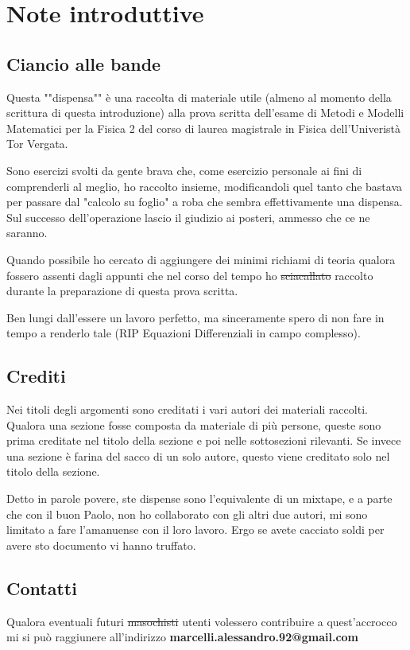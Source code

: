 \chapter{Note introduttive}

\section{Ciancio alle bande}

Questa ""dispensa"" è una raccolta di materiale utile (almeno al momento della scrittura di questa introduzione) alla prova scritta dell'esame  di Metodi e Modelli Matematici per la Fisica 2 del corso di laurea magistrale in Fisica dell'Univeristà Tor Vergata. 

Sono esercizi svolti da gente brava che, come esercizio personale ai fini di comprenderli al meglio, ho raccolto insieme, modificandoli quel tanto che bastava per passare dal "calcolo su foglio" a roba che sembra effettivamente una dispensa. Sul successo dell'operazione lascio il giudizio ai posteri, ammesso che ce ne saranno.

Quando possibile ho cercato di aggiungere dei minimi richiami di teoria qualora fossero assenti dagli appunti che nel corso del tempo ho \st{sciacallato} raccolto durante la preparazione di questa prova scritta.

Ben lungi dall'essere un lavoro perfetto, ma sinceramente spero di non fare in tempo a renderlo tale (RIP Equazioni Differenziali in campo complesso). 

\section{Crediti}

Nei titoli degli argomenti sono creditati i vari autori dei materiali raccolti. Qualora una sezione fosse composta da materiale di più persone, queste sono prima creditate nel titolo della sezione e poi nelle sottosezioni rilevanti. Se invece una sezione è farina del sacco di un solo autore, questo viene creditato solo nel titolo della sezione.

Detto in parole povere, ste dispense sono l'equivalente di un mixtape, e a parte che con il buon Paolo, non ho collaborato con gli altri due autori, mi sono limitato a fare l'amanuense con il loro lavoro. Ergo se avete cacciato soldi per avere sto documento vi hanno truffato.

\section{Contatti}

Qualora eventuali futuri \st{masochisti} utenti volessero contribuire a quest'accrocco mi si può raggiunere all'indirizzo \textbf{marcelli.alessandro.92@gmail.com}

